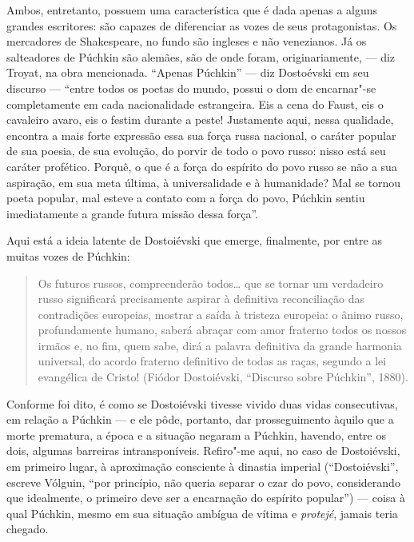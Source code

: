 Ambos, entretanto, possuem uma característica que é dada apenas a alguns
grandes escritores: são capazes de diferenciar as vozes de seus
protagonistas. Os mercadores de Shakespeare, no fundo são ingleses e não
venezianos. Já os salteadores de Púchkin são alemães, são de onde foram,
originariamente, --- diz Troyat, na obra mencionada. ``Apenas
Púchkin'' --- diz Dostoévski em seu discurso --- ``entre todos os poetas
do mundo, possui o dom de encarnar"-se completamente em cada
nacionalidade estrangeira. Eis a cena do Faust, eis o cavaleiro avaro,
eis o festim durante a peste! Justamente aqui, nessa qualidade, encontra a mais forte expressão essa
sua força russa nacional, o caráter popular de sua poesia, de sua
evolução, do porvir de todo o povo russo: nisso está seu caráter
profético. Porquê, o que é a força do espírito do povo russo se não a
sua aspiração, em sua meta última, à universalidade e à humanidade? Mal
se tornou poeta popular, mal esteve a contato com a força do povo,
Púchkin sentiu imediatamente a grande futura missão dessa força''.

Aqui está a ideia latente de Dostoiévski que emerge, finalmente, por
entre as muitas vozes de Púchkin:

\begin{quote}
Os futuros russos, compreenderão todos\ldots{} que se tornar um verdadeiro
russo significará precisamente aspirar à definitiva reconciliação das
contradições europeias, mostrar a saída à tristeza europeia: o ânimo
russo, profundamente humano, saberá abraçar com amor fraterno todos os
nossos irmãos e, no fim, quem sabe, dirá a palavra definitiva da grande
harmonia universal, do acordo fraterno definitivo de todas as raças,
segundo a lei evangélica de Cristo! (Fiódor Dostoiévski,
``Discurso sobre Púchkin'', 1880).
\end{quote}

Conforme foi dito, é como se Dostoiévski tivesse vivido duas vidas
consecutivas, em relação a Púchkin --- e ele pôde, portanto, dar
prosseguimento àquilo que a morte prematura, a época e a situação
negaram a Púchkin, havendo, entre os dois, algumas barreiras intransponíveis. Refiro"-me aqui, no caso
de Dostoiévski, em primeiro lugar, à aproximação consciente à dinastia
imperial (``Dostoiévski'', escreve Vólguin, ``por princípio, não
queria separar o czar do povo, considerando que idealmente, o primeiro
deve ser a encarnação do espírito popular'') --- coisa à qual Púchkin,
mesmo em sua situação ambígua de vítima e \emph{protejé}, jamais teria
chegado.


